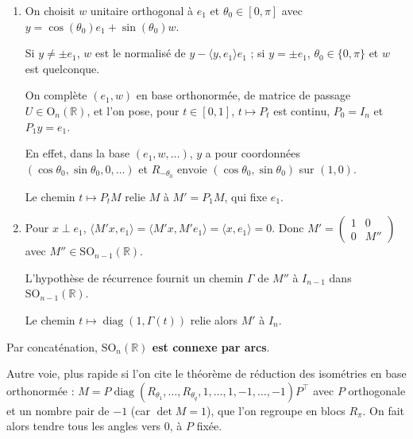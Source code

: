 \documentclass[11pt,a4paper]{article}
\newcommand{\equationajustee}[1]{%
  \sbox{\boiteequation}{$\displaystyle #1$}%
  \ifdim\wd\boiteequation>\linewidth
    \[\resizebox{\linewidth}{!}{\usebox{\boiteequation}}\]%
  \else
    \[#1\]%
  \fi}
\begin{document}
\begin{enumerate}
\def\labelenumi{\arabic{enumi}.}
\item
  On choisit \(w\) unitaire orthogonal à \(e_1\) et \(\theta_0\in[0,\pi]\) avec \(y=\cos(\theta_0)e_1+\sin(\theta_0)w\).

  Si \(y\neq\pm e_1\), \(w\) est le normalisé de \(y-\langle y,e_1\rangle e_1\) ; si \(y=\pm e_1\), \(\theta_0\in\{0,\pi\}\) et \(w\) est quelconque.

  On complète \((e_1,w)\) en base orthonormée, de matrice de passage \(U\in{\mathrm{O}}_n(\mathbb{R})\), et l'on pose, pour \(t\in[0,1]\),
  \equationajustee{P_t=U\begin{pmatrix}R_{-t\theta_0}&0\\0&I_{n-2}\end{pmatrix}U^{-1}\in{\mathrm{SO}}_n(\mathbb{R}).}
  \(t\mapsto P_t\) est continu, \(P_0=I_n\) et \(P_1y=e_1\).

  En effet, dans la base \((e_1,w,\dots)\), \(y\) a pour coordonnées \((\cos\theta_0,\sin\theta_0,0,\dots)\) et \(R_{-\theta_0}\) envoie \((\cos\theta_0,\sin\theta_0)\) sur \((1,0)\).

  Le chemin \(t\mapsto P_tM\) relie \(M\) à \(M'=P_1M\), qui fixe \(e_1\).
\item
  Pour \(x\perp e_1\), \(\langle M'x,\allowbreak e_1\rangle=\langle M'x,\allowbreak M'e_1\rangle=\langle x,\allowbreak e_1\rangle=0\). Donc \(M'=\begin{pmatrix}1&0\\0&M''\end{pmatrix}\) avec \(M''\in{\mathrm{SO}}_{n-1}(\mathbb{R})\).

  L'hypothèse de récurrence fournit un chemin \(\Gamma\) de \(M''\) à \(I_{n-1}\) dans \({\mathrm{SO}}_{n-1}(\mathbb{R})\).

  Le chemin \(t\mapsto\operatorname{diag}(1,\Gamma(t))\) relie alors \(M'\) à \(I_n\).
\end{enumerate}

Par concaténation, \textbf{\({\mathrm{SO}}_n(\mathbb{R})\) est connexe par arcs}.

\begin{methode}

Autre voie, plus rapide si l'on cite le théorème de réduction des isométries en base orthonormée : \(M=P\operatorname{diag}(R_{\theta_1},\allowbreak \dots,\allowbreak R_{\theta_q},\allowbreak 1,\allowbreak \dots,\allowbreak 1,\allowbreak -1,\allowbreak \dots,\allowbreak -1)P^\top\) avec \(P\) orthogonale et un nombre pair de \(-1\) (car \(\det M=1\)), que l'on regroupe en blocs \(R_\pi\). On fait alors tendre tous les angles vers 0, à \(P\) fixée.

\end{methode}
\end{document}
